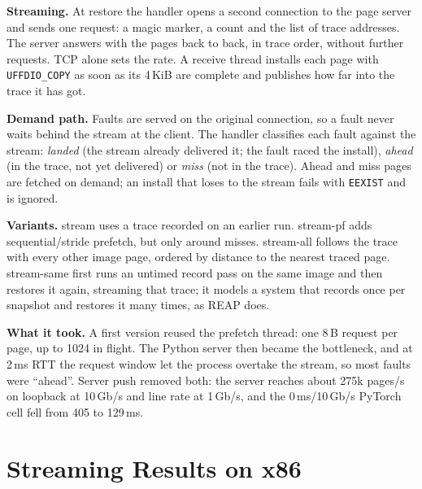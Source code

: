 \documentclass[conference]{IEEEtran}
\newcommand{\mode}[1]{\textsf{#1}}
\begin{document}
\textbf{Streaming.} At restore the handler opens a second connection to the
page server and sends one request: a magic marker, a count and the list of
trace addresses. The server answers with the pages back to back, in trace
order, without further requests. TCP alone sets the rate. A receive thread
installs each page with \texttt{UFFDIO\_COPY} as soon as its 4\,KiB are
complete and publishes how far into the trace it has got.

\textbf{Demand path.} Faults are served on the original connection, so a
fault never waits behind the stream at the client. The handler classifies
each fault against the stream: \emph{landed} (the stream already delivered
it; the fault raced the install), \emph{ahead} (in the trace, not yet
delivered) or \emph{miss} (not in the trace). Ahead and miss pages are
fetched on demand; an install that loses to the stream fails with
\texttt{EEXIST} and is ignored.

\textbf{Variants.} \mode{stream} uses a trace recorded on an earlier run.
\mode{stream-pf} adds sequential/stride prefetch, but only around misses.
\mode{stream-all} follows the trace with every other image page, ordered by
distance to the nearest traced page. \mode{stream-same} first runs an
untimed record pass on the same image and then restores it again, streaming
that trace; it models a system that records once per snapshot and restores
it many times, as REAP does.

\textbf{What it took.} A first version reused the prefetch thread: one 8\,B
request per page, up to 1024 in flight. The Python server then became the
bottleneck, and at 2\,ms RTT the request window let the process overtake
the stream, so most faults were ``ahead''. Server push removed both: the
server reaches about 275k pages/s on loopback at 10\,Gb/s and line rate at
1\,Gb/s, and the 0\,ms/10\,Gb/s PyTorch cell fell from 405 to 129\,ms.

\section{Streaming Results on x86}
\label{sec:stream}
\end{document}

